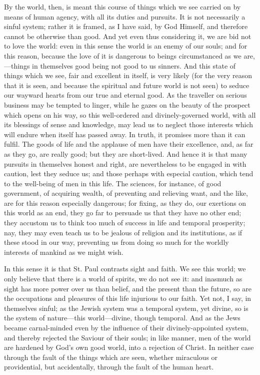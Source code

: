 By the world, then, is meant this course of things which we see
carried on by means of human agency, with all its duties and pursuits.
It is not necessarily a sinful system; rather it is framed, as I have
said, by God Himself, and therefore cannot be otherwise than good. And
yet even thus considering it, we are bid not to love the world: even
in this sense the world is an enemy of our souls; and for this reason,
because the love of it is dangerous to beings circumstanced as we are,—things
in themselves good being not good to us sinners. And this state of
things which we see, fair and excellent in itself, is very likely (for
the very reason that it is seen, and because the spiritual and future
world is not seen) to seduce our wayward hearts from our true and
eternal good. As the traveller on serious business may be tempted to
linger, while he gazes on the beauty of the prospect which opens on
his way, so this well-ordered and divinely-governed world, with all
its blessings of sense and knowledge, may lead us to neglect those
interests which will endure when itself has passed away. In truth, it
promises more than it can fulfil. The goods of life and the applause
of men have their excellence, and, as far as they go, are really good;
but they are short-lived. And hence it is that many pursuits in
themselves honest and right, are nevertheless to be engaged in with
caution, lest they seduce us; and those perhaps with especial caution,
which tend to the well-being of men in this life. The sciences, for
instance, of good government, of acquiring wealth, of preventing and
relieving want, and the like, are for this reason especially
dangerous; for fixing, as they do, our exertions on this world as an
end, they go far to persuade us that they have no other end; they
accustom us to think too much of success in life and temporal
prosperity; nay, they may even teach us to be jealous of religion and
its institutions, as if these stood in our way, preventing us from
doing so much for the worldly interests of mankind as we might wish.

In this sense it is that St. Paul contrasts sight and faith. We see
this world; we only believe that there is a world of spirits, we do
not see it: and inasmuch as sight has more power over us than belief,
and the present than the future, so are the occupations and pleasures
of this life injurious to our faith. Yet not, I say, in themselves
sinful; as the Jewish system was a temporal system, yet divine, so is
the system of nature—this world—divine, though temporal. And as
the Jews became carnal-minded even by the influence of their
divinely-appointed system, and thereby rejected the Saviour of their
souls; in like manner, men of the world are hardened by God's own good
world, into a rejection of Christ. In neither case through the fault
of the things which are seen, whether miraculous or providential, but
accidentally, through the fault of the human heart.


